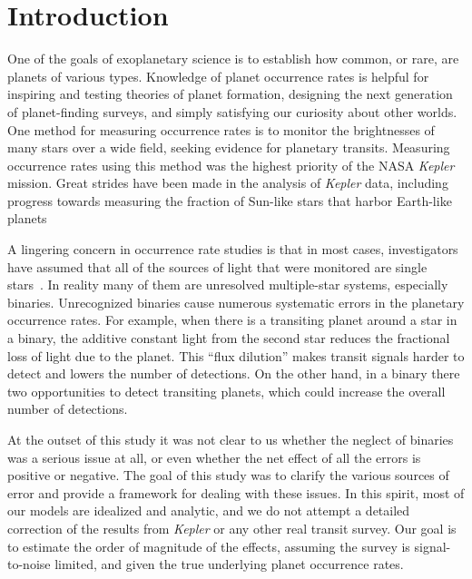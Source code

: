 \documentclass[12pt,modern]{aastex61}
\begin{document}
\section{Introduction}

One of the goals of exoplanetary science is to establish how common,
or rare, are planets of various types.  Knowledge of planet occurrence
rates is helpful for inspiring and testing theories of planet
formation, designing the next generation of planet-finding surveys,
and simply satisfying our curiosity about other worlds.  One method
for measuring occurrence rates is to monitor the brightnesses of many
stars over a wide field, seeking evidence for planetary transits.
Measuring occurrence rates using this method was the highest priority
of the NASA {\it Kepler} mission.  Great strides have been made in the
analysis of {\it Kepler} data, including progress towards measuring
the fraction of Sun-like stars that harbor Earth-like planets~\citep{
  youdin_exoplanet_2011,petigura_prevalence_2013,dong_fast_2013,
  foreman-mackey_exoplanet_2014,burke_terrestrial_2015}

A lingering concern in occurrence rate studies is that in most cases,
investigators have assumed that all of the sources of light that were
monitored are single stars~\citep[\textit{e.g.},][]{
  howard_planet_2012,fressin_false_2013,
  dressing_occurrence_2015,burke_terrestrial_2015}. In reality many of
them are unresolved multiple-star systems, especially binaries.
Unrecognized binaries cause numerous systematic errors in the
planetary occurrence rates.  For example, when there is a transiting
planet around a star in a binary, the additive constant light from the
second star reduces the fractional loss of light due to the planet.
This ``flux dilution'' makes transit signals harder to detect and
lowers the number of detections.  On the other hand, in a binary there
two opportunities to detect transiting planets, which could increase
the overall number of detections.

At the outset of this study it was not clear to us whether the neglect
of binaries was a serious issue at all, or even whether the net effect
of all the errors is positive or negative.  The goal of this study was
to clarify the various sources of error and provide a framework for
dealing with these issues.  In this spirit, most of our models are
idealized and analytic, and we do not attempt a detailed correction of
the results from {\it Kepler} or any other real transit survey.
Our goal is to estimate the order of magnitude of the effects,
assuming the survey is signal-to-noise limited, and given the true
underlying planet occurrence rates.
\end{document}
